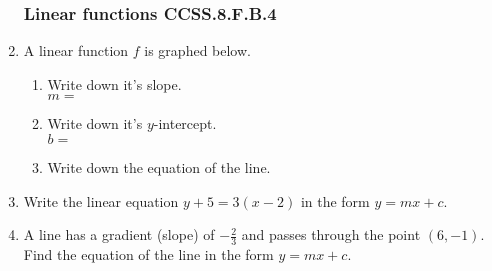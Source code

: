 \documentclass[12pt, twoside]{article}
\begin{document}
\begin{enumerate}
\newpage
\subsubsection*{Linear functions \hfill CCSS.8.F.B.4}
\item A linear function $f$ is graphed below.
    \begin{multicols}{2}
    \begin{enumerate}
      \item Write down it's slope.\\ $m=$
      \vspace{0.25cm}
      \item Write down it's $y$-intercept.\\ $b=$
      \vspace{0.25cm}
      \item Write down the equation of the line.
    \end{enumerate} \vspace{.5cm}
      \begin{center} 
      \end{center}
    \end{multicols} \vspace{1cm}
    
    \item Write the linear equation $y+5=3(x-2)$ in the form $y=mx+c$. \vspace{4cm}
    
    \item A line has a gradient (slope) of $\displaystyle -\frac{2}{3}$ and passes through the point $(6, -1)$. Find the equation of the line in the form $y=mx+c$.
    

\end{enumerate}
\end{document}
